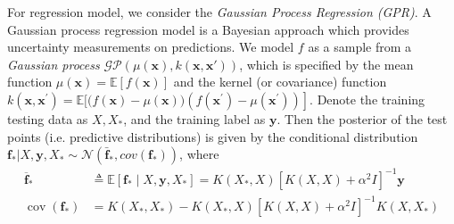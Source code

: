For regression model, we consider the \textit{Gaussian Process Regression (GPR)}.
A Gaussian process regression model \cite{Rasmussen2004} is a Bayesian approach which provides uncertainty measurements on predictions. 
We model $f$ as a sample from a \textit{Gaussian process} $\mathcal{G} \mathcal{P}(\mu(\mathbf{x}), k(\mathbf{x}, \mathbf{x'}))$, which is specified by the mean function $\mu(\mathbf{x})=\mathbb{E}[f(\mathbf{x})]$ and the kernel (or covariance) function $k\left(\mathbf{x}, \mathbf{x}^{\prime}\right)=\mathbb{E}[(f(\mathbf{x})-\left.\mu(\mathbf{x}))\left(f\left(\mathbf{x}^{\prime}\right)-\mu\left(\mathbf{x}^{\prime}\right)\right)\right]$.
Denote the training testing data as $X, X_{*}$, and the training label as $\mathbf{y}$.
Then the posterior of the test points (i.e. predictive distributions) is given by the conditional distribution $\mathbf{f}_\ast | X, \mathbf{y}, X_\ast \sim \mathcal{N}(\bar{\mathbf{f}}_\ast, cov(\mathbf{f}_\ast))$, where
\begin{align}
\overline{\mathbf{f}}_{*} & \triangleq \mathbb{E}\left[\mathbf{f}_{*} \mid X, \mathbf{y}, X_{*}\right]=K\left(X_{*}, X\right)\left[K(X, X)+\alpha^{2} I\right]^{-1} \mathbf{y} \\
\label{Eq: predicted variance in main paper}
\operatorname{cov}\left(\mathbf{f}_{*}\right) &=K\left(X_{*}, X_{*}\right)-K\left(X_{*}, X\right)\left[K(X, X)+\alpha^{2} I\right]^{-1} K\left(X, X_{*}\right) 
\end{align}

